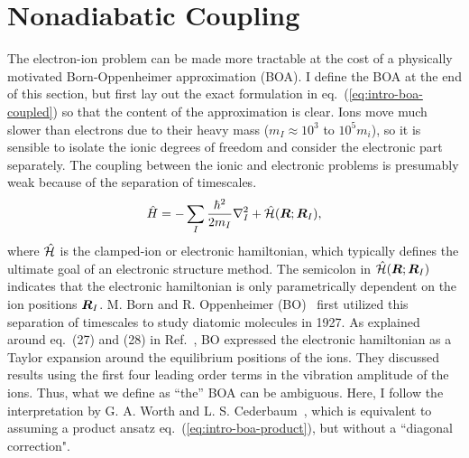\chapter{Nonadiabatic Coupling} \label{app:nad}

The electron-ion problem can be made more tractable at the cost of a physically motivated Born-Oppenheimer approximation (BOA). I define the BOA at the end of this section, but first lay out the exact formulation in eq.~(\ref{eq:intro-boa-coupled}) so that the content of the approximation is clear.
Ions move much slower than electrons due to their heavy mass ($m_I\approx 10^3$ to $10^5 m_i$), so it is sensible to isolate the ionic degrees of freedom and consider the electronic part separately. The coupling between the ionic and electronic problems is presumably weak because of the separation of timescales.
\begin{align} \label{eq:intro-ei-to-e-ham}
\hat{H} = -\sum_I \frac{\hbar^2}{2m_I} \nabla^2_I
+ \hat{\mathcal{H}}(\boldsymbol{R};\boldsymbol{R}_I),
\end{align}
where $\hat{\mathcal{H}}$ is the clamped-ion or electronic hamiltonian, which typically defines the ultimate goal of an electronic structure method. The semicolon in $\hat{\mathcal{H}}(\boldsymbol{R};\boldsymbol{R}_I)$ indicates that the electronic hamiltonian is only parametrically dependent on the ion positions $\boldsymbol{R}_I$. M. Born and R. Oppenheimer (BO)~\cite{Born1927} first utilized this separation of timescales to study diatomic molecules in 1927. As explained around eq.~(27) and (28) in Ref.~\cite{Born1927}, BO expressed the electronic hamiltonian as a Taylor expansion around the equilibrium positions of the ions. They discussed results using the first four leading order terms in the vibration amplitude of the ions. Thus, what we define as ``the'' BOA can be ambiguous. Here, I follow the interpretation by G. A. Worth and L. S. Cederbaum~\cite{Worth2004}, which is equivalent to assuming a product ansatz eq.~(\ref{eq:intro-boa-product}), but without a ``diagonal correction".

